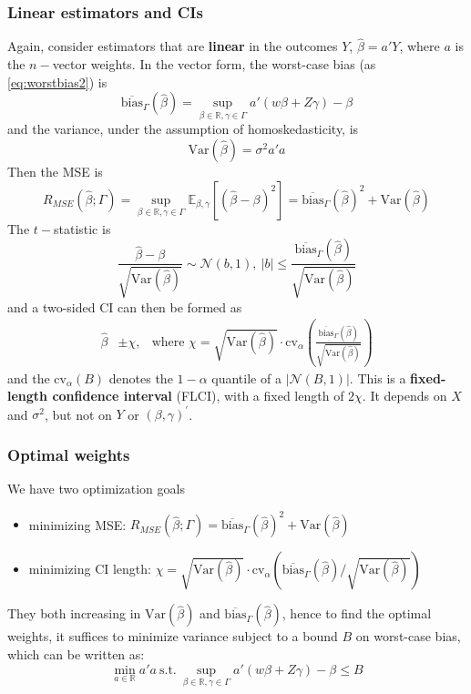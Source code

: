 \documentclass[twoside]{article}
\let\bar\overline
\theoremstyle{definition}
\begin{document}
\subsubsection*{Linear estimators and CIs}
Again, consider estimators that are \textbf{linear} in the outcomes $Y$, $\hat{\beta}=a'Y$, where $a$ is the $n-$vector weights. In the vector form, the worst-case bias (as \ref{eq:worstbias2}) is 
\begin{equation}
  \bar{\mathrm{bias}}_{\Gamma}\left(\hat{\beta}\right) = \sup_{\beta\in\mathbb{R},\gamma\in\Gamma} a'\left( w\beta + Z\gamma \right)-\beta
\end{equation}
and the variance, under the assumption of homoskedasticity, is $$ \mathrm{Var} \left(\hat{\beta}\right) = \sigma^2a'a $$
Then the MSE is 
$$
  R_{MSE}\left(\hat{\beta};\Gamma\right)=\sup_{\beta\in\mathbb{R},\gamma\in\Gamma}\mathbb{E}_{\beta,\gamma}\left[\left(\hat{\beta}-\beta\right)^2\right]=\bar{\mathrm{bias}}_{\Gamma}\left(\hat{\beta}\right)^2 +\mathrm{Var}\left(\hat{\beta}\right)
$$
The $t-$statistic is $$ \frac{\hat{\beta}-\beta}{\sqrt{\mathrm{Var}\left(\hat{\beta}\right)}} \sim \mathcal{N}(b,1),\ \lvert b\rvert\leq \frac{\bar{\mathrm{bias}}_{\Gamma}\left(\hat{\beta}\right)}{\sqrt{\mathrm{Var}\left(\hat{\beta}\right)}}$$
and a two-sided CI can then be formed as
\begin{align}
  \hat{\beta} &\pm \chi, &\text{where }\chi=\sqrt{\mathrm{Var}\left(\hat{\beta}\right)}\cdot \mathrm{cv}_{\alpha}\left( \frac{\bar{\mathrm{bias}}_{\Gamma}\left(\hat{\beta}\right)}{\sqrt{\mathrm{Var}\left(\hat{\beta}\right)}} \right)
\end{align}
and the $\mathrm{cv}_{\alpha}(B)$ denotes the $1-\alpha$ quantile of a $\lvert \mathcal{N}(B,1) \rvert$. This is a \textbf{fixed-length confidence interval} (FLCI), with a fixed length of $2\chi$. It depends on $X$ and $\sigma^2$, but not on $Y$ or $(\beta,\gamma)^{\prime}$.

\subsubsection*{Optimal weights}
We have two optimization goals
\begin{itemize}
  \item minimizing MSE: $ R_{MSE}\left(\hat{\beta};\Gamma\right)=\bar{\mathrm{bias}}_{\Gamma}\left(\hat{\beta}\right)^2 +\mathrm{Var}\left(\hat{\beta}\right)$
  \item minimizing CI length: $\chi=\sqrt{\mathrm{Var}\left(\hat{\beta}\right)}\cdot \mathrm{cv}_{\alpha}\left( \bar{\mathrm{bias}}_{\Gamma}\left(\hat{\beta}\right)/\sqrt{\mathrm{Var}\left(\hat{\beta}\right)} \right)$
\end{itemize}
They both increasing in $\mathrm{Var}\left(\hat{\beta}\right)$ and $\bar{\mathrm{bias}}_{\Gamma}\left(\hat{\beta}\right)$, hence to find the optimal weights, it suffices to minimize variance subject to a bound $B$ on worst-case bias, which can be written as:
\begin{equation}\label{eq:solve_optimalweight}
  \min_{a\in\mathbb{R}}a'a\ \text{s.t.}\ \sup_{\beta\in\mathbb{R},\gamma\in\Gamma}a'\left(w\beta+Z\gamma \right)-\beta \leq B
\end{equation}
\end{document}
